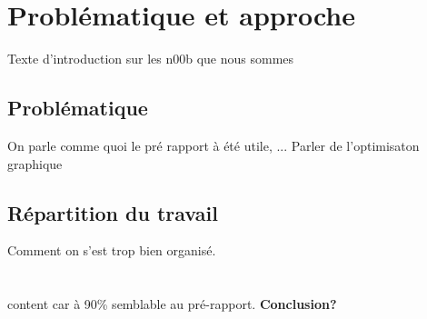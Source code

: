 \newpage
\section{Problématique et approche}
Texte d'introduction sur les n00b que nous sommes


	\subsection{Problématique}
	On parle comme quoi le pré rapport à été utile, ...
	Parler de l'optimisaton graphique
	
	\subsection{Répartition du travail}
	Comment on s'est trop bien organisé.\\
	\\
	\\
	content car à 90\% semblable au pré-rapport. \textbf{Conclusion?}















